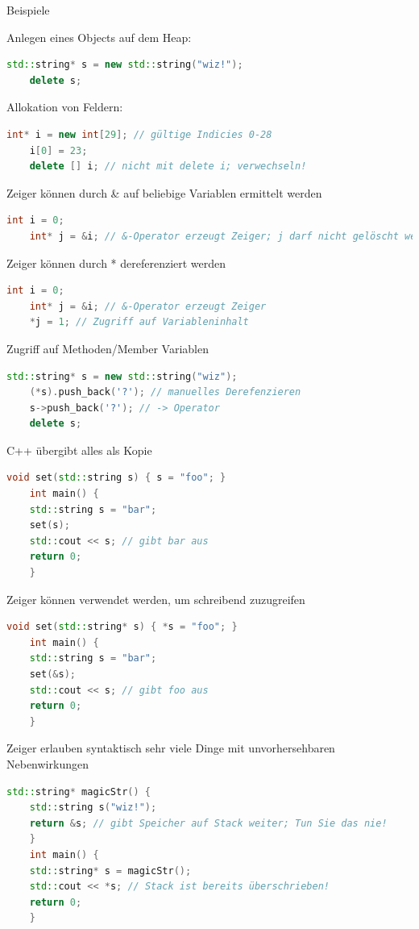 \documentclass[10pt]{article}
\begin{document}
Beispiele
\begin{itemize*}
  \item Anlegen eines Objects auf dem Heap:
  \begin{lstlisting}[language=C++]
    std::string* s = new std::string("wiz!");
    delete s;
    \end{lstlisting}
  \item Allokation von Feldern:
  \begin{lstlisting}[language=C++]
    int* i = new int[29]; // gültige Indicies 0-28
    i[0] = 23;
    delete [] i; // nicht mit delete i; verwechseln!
    \end{lstlisting}
  \item Zeiger können durch \& auf beliebige Variablen ermittelt werden
  \begin{lstlisting}[language=C++]
    int i = 0;
    int* j = &i; // &-Operator erzeugt Zeiger; j darf nicht gelöscht werden
    \end{lstlisting}
  \item Zeiger können durch * dereferenziert werden
  \begin{lstlisting}[language=C++]
    int i = 0;
    int* j = &i; // &-Operator erzeugt Zeiger
    *j = 1; // Zugriff auf Variableninhalt
    \end{lstlisting}
  \item Zugriff auf Methoden/Member Variablen
  \begin{lstlisting}[language=C++]
    std::string* s = new std::string("wiz");
    (*s).push_back('?'); // manuelles Derefenzieren
    s->push_back('?'); // -> Operator
    delete s;
    \end{lstlisting}
  \item C++ übergibt alles als Kopie
  \begin{lstlisting}[language=C++]
    void set(std::string s) { s = "foo"; }
    int main() {
    std::string s = "bar";
    set(s);
    std::cout << s; // gibt bar aus
    return 0;
    }
    \end{lstlisting}
  \item Zeiger können verwendet werden, um schreibend zuzugreifen
  \begin{lstlisting}[language=C++]
    void set(std::string* s) { *s = "foo"; }
    int main() {
    std::string s = "bar";
    set(&s);
    std::cout << s; // gibt foo aus
    return 0;
    }
    \end{lstlisting}
  \item Zeiger erlauben syntaktisch sehr viele Dinge mit unvorhersehbaren Nebenwirkungen
  \begin{lstlisting}[language=C++]
    std::string* magicStr() {
    std::string s("wiz!");
    return &s; // gibt Speicher auf Stack weiter; Tun Sie das nie!
    }
    int main() {
    std::string* s = magicStr();
    std::cout << *s; // Stack ist bereits überschrieben!
    return 0;
    }
    \end{lstlisting}
\end{itemize*}
\end{document}
